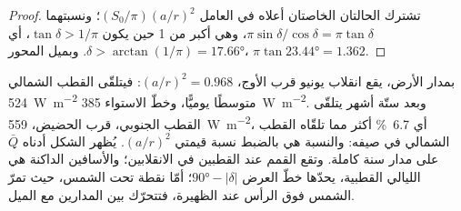 \begin{proof}
تشترك الحالتان الخاصتان أعلاه في العامل $(S_0/\pi)(a/r)^2$؛ ونسبتهما $\pi\sin\delta/\cos\delta = \pi\tan\delta$، وهي أكبر من 1 حين يكون $\tan\delta >
1/\pi$، أي $\delta > \arctan(1/\pi) = \ang{17.66}$. وبميل المحور،
$\pi\tan\ang{23.44} = 1.362$.
\end{proof}

بمدار الأرض، يقع انقلاب يونيو قرب الأوج، $(a/r)^2 = 0.968$: فيتلقّى القطب الشمالي \qty{524}{W.m^{-2}} متوسطًا يوميًّا، وخطّ الاستواء \qty{385}{W.m^{-2}}. وبعد ستّة أشهر يتلقّى القطب الجنوبي، قرب الحضيض، \qty{559}{W.m^{-2}}، أي \qty{6.7}{\percent} أكثر مما تلقّاه القطب الشمالي في صيفه: والنسبة هي بالضبط نسبة قيمتي $(a/r)^2$. يُظهر الشكل أدناه $\bar Q$ على مدار سنة كاملة. وتقع القمم عند القطبين في الانقلابين؛ والأسافين الداكنة هي الليالي القطبية، يحدّها خطّ العرض $\ang{90} -
|\delta|$؛ أمّا نقطة تحت الشمس، حيث تمرّ الشمس فوق الرأس عند الظهيرة، فتتحرّك بين المدارين مع الميل.

